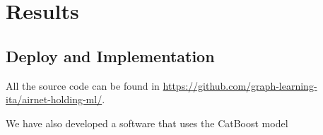 \chapter{Results}
\label{Results}


\section{Deploy and Implementation}

All the source code can be found in \href{https://github.com/graph-learning-ita/airnet-holding-ml/}{https://github.com/graph-learning-ita/airnet-holding-ml/}. 

We have also developed a software that uses the CatBoost model 